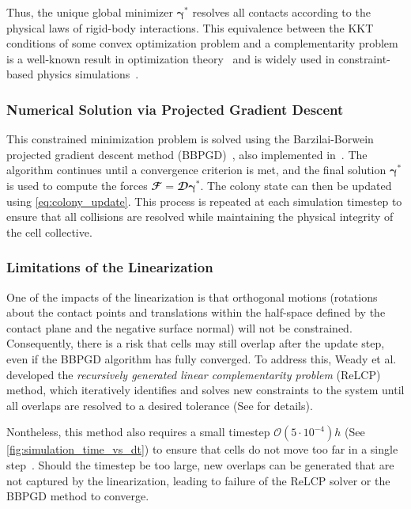 \documentclass[conference]{IEEEtran}
\begin{document}
Thus, the unique global minimizer $ \boldsymbol{\gamma}^* $ resolves all contacts according to the physical laws of rigid-body interactions. This equivalence between the KKT conditions
of some convex optimization problem and a complementarity problem is a well-known result in
optimization theory~\cite{Nocedal2006} and is widely used in constraint-based physics simulations~\cite{Yan2022,Tasora2008, Yan2019, Li2021, Weady2024SM,Rudge2012,Macklin2014,Ferguson2021}.



\subsubsection{Numerical Solution via Projected Gradient Descent}

This constrained minimization problem is solved using the Barzilai-Borwein projected gradient descent method (BBPGD)~\cite{BBPGD}, also implemented in~\cite{Weady2024SM,Yan2019}. The algorithm continues until a convergence criterion is met, and the final solution $\boldsymbol{\gamma}^*$ is used to compute the forces $\mathbfcal{F} = \mathbfcal{D}\boldsymbol{\gamma}^*$. The colony state can then be updated using \autoref{eq:colony_update}. This process is repeated at each simulation timestep to ensure that all collisions are resolved while maintaining the physical integrity of the cell collective.

\subsubsection{Limitations of the Linearization}

One of the impacts of the linearization is that orthogonal motions (rotations about the contact points and translations within the half-space defined by the contact plane and the negative surface normal) will not be constrained. Consequently, there is a risk that cells may still overlap after the update step, even if the BBPGD algorithm has fully converged. To address this, Weady et al.~\cite{Weady2024SM} developed the \textit{recursively generated linear complementarity problem} (ReLCP) method, which iteratively identifies and solves new constraints to the system until all overlaps are resolved to a desired tolerance (See \cite{Weady2024SM} for details).

Nontheless, this method also requires a small timestep $\mathcal{O}(5\cdot 10^{-4}) h$ (See \autoref{fig:simulation_time_vs_dt}) to ensure that cells do not move too far in a single step~\cite{Yan2022}. Should the timestep be too large, new overlaps can be generated that are not captured by the linearization, leading to failure of the ReLCP solver or the BBPGD method to converge.
\end{document}
